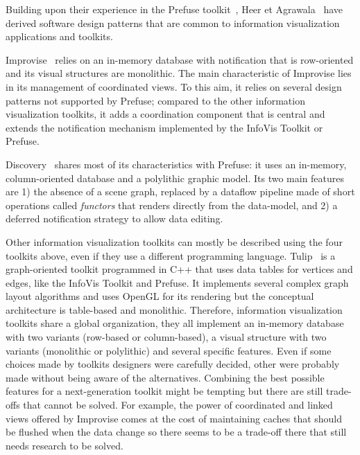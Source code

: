 Building upon their experience in the Prefuse toolkit~\cite{Prefuse},
Heer et Agrawala~\cite{DesignPatternsIV} have derived software design
patterns that are common to information visualization applications and
toolkits. 

Improvise~\cite{Improvise} relies on an in-memory database with
notification that is row-oriented and its visual structures are
monolithic.  The main characteristic of Improvise lies in its
management of coordinated views.  To this aim, it relies on several
design patterns not supported by Prefuse; compared to the other
information visualization toolkits, it adds a coordination component
that is central and extends the notification mechanism implemented
by the InfoVis Toolkit or Prefuse.

Discovery~\cite{Discovery1,Discovery2,Discovery3} shares most of its
characteristics with Prefuse: it uses an in-memory, column-oriented
database and a polylithic graphic model. Its two main features are 1)
the absence of a scene graph, replaced by a dataflow pipeline made of
short operations called \emph{functors} that renders directly from the
data-model, and 2) a deferred notification strategy to allow data
editing.


Other information visualization toolkits can mostly be described using
the four toolkits above, even if they use a different programming
language.  Tulip~\cite{Tulip} is a graph-oriented toolkit programmed
in C++ that uses data tables for vertices and edges, like the InfoVis
Toolkit and Prefuse.  It implements several complex graph layout
algorithms and uses OpenGL for its rendering but the conceptual
architecture is table-based and monolithic.  Therefore, information
visualization toolkits share a global organization, they all implement
an in-memory database with two variants (row-based or column-based), a
visual structure with two variants (monolithic or polylithic) and
several specific features.  Even if some choices made by toolkits
designers were carefully decided, other were probably made without
being aware of the alternatives.  Combining the best possible features
for a next-generation toolkit might be tempting but there are still
trade-offs that cannot be solved.  For example, the power of
coordinated and linked views offered by Improvise comes at the cost of
maintaining caches that should be flushed when the data change so
there seems to be a trade-off there that still needs research to be
solved.

